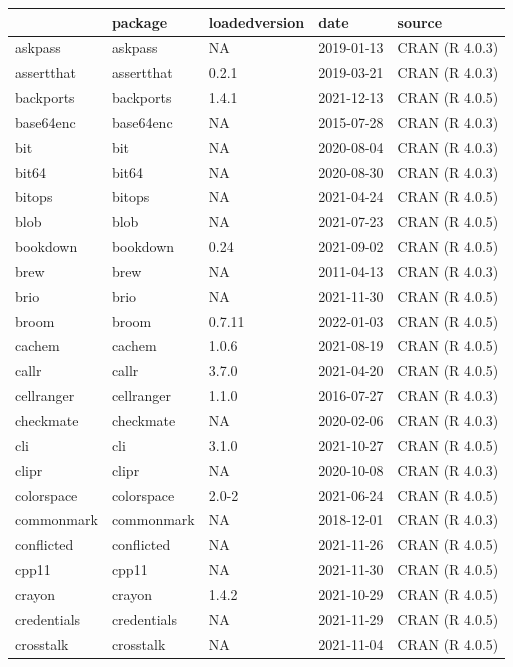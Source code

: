 \begin{tabular}{lllll}
\toprule
  & package & loadedversion & date & source\\
\midrule
askpass & askpass & NA & 2019-01-13 & CRAN (R 4.0.3)\\
assertthat & assertthat & 0.2.1 & 2019-03-21 & CRAN (R 4.0.3)\\
backports & backports & 1.4.1 & 2021-12-13 & CRAN (R 4.0.5)\\
base64enc & base64enc & NA & 2015-07-28 & CRAN (R 4.0.3)\\
bit & bit & NA & 2020-08-04 & CRAN (R 4.0.3)\\
\addlinespace
bit64 & bit64 & NA & 2020-08-30 & CRAN (R 4.0.3)\\
bitops & bitops & NA & 2021-04-24 & CRAN (R 4.0.5)\\
blob & blob & NA & 2021-07-23 & CRAN (R 4.0.5)\\
bookdown & bookdown & 0.24 & 2021-09-02 & CRAN (R 4.0.5)\\
brew & brew & NA & 2011-04-13 & CRAN (R 4.0.3)\\
\addlinespace
brio & brio & NA & 2021-11-30 & CRAN (R 4.0.5)\\
broom & broom & 0.7.11 & 2022-01-03 & CRAN (R 4.0.5)\\
cachem & cachem & 1.0.6 & 2021-08-19 & CRAN (R 4.0.5)\\
callr & callr & 3.7.0 & 2021-04-20 & CRAN (R 4.0.5)\\
cellranger & cellranger & 1.1.0 & 2016-07-27 & CRAN (R 4.0.3)\\
\addlinespace
checkmate & checkmate & NA & 2020-02-06 & CRAN (R 4.0.3)\\
cli & cli & 3.1.0 & 2021-10-27 & CRAN (R 4.0.5)\\
clipr & clipr & NA & 2020-10-08 & CRAN (R 4.0.3)\\
colorspace & colorspace & 2.0-2 & 2021-06-24 & CRAN (R 4.0.5)\\
commonmark & commonmark & NA & 2018-12-01 & CRAN (R 4.0.3)\\
\addlinespace
conflicted & conflicted & NA & 2021-11-26 & CRAN (R 4.0.5)\\
cpp11 & cpp11 & NA & 2021-11-30 & CRAN (R 4.0.5)\\
crayon & crayon & 1.4.2 & 2021-10-29 & CRAN (R 4.0.5)\\
credentials & credentials & NA & 2021-11-29 & CRAN (R 4.0.5)\\
crosstalk & crosstalk & NA & 2021-11-04 & CRAN (R 4.0.5)\\

\end{tabular}
